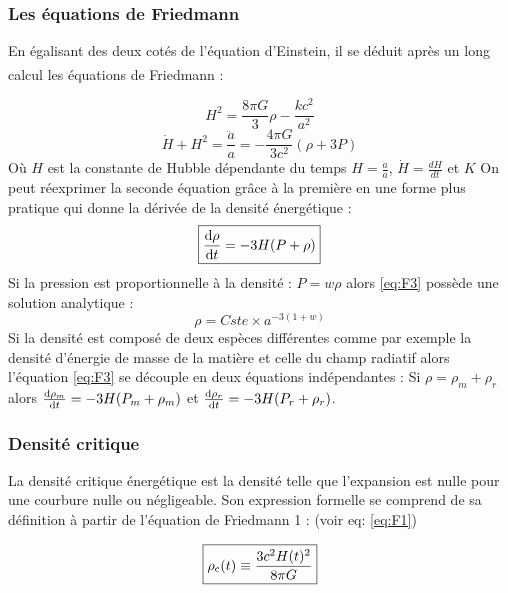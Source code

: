 \documentclass[10pt, a4paper]{report}
\numberwithin{equation}{subsection}
\begin{document}
\subsubsection{Les équations de Friedmann}
En égalisant des deux cotés de l'équation d'Einstein, il se déduit après un long calcul\textsuperscript{\cite{cours_RG1}} les équations de Friedmann :

\begin{equation} \label{eq:F1}
\boxed{H^2 = \frac{8 \pi G}{3}\rho - \frac{kc^2}{a^2}}
\end{equation}
\begin{equation} \label{eq:F2}
\boxed{\dot{H} + H^2 = \frac{\ddot{a}}{a} = - \frac{4\pi G}{3c^2}\left(\rho + 3P\right) }
\end{equation}
Où $H$ est la constante de Hubble dépendante du temps $H=\frac{\dot{a}}{a}$, $\dot{H} = \frac{dH}{dt}$ et $K$
On peut réexprimer la seconde équation grâce à la première en une forme plus pratique qui donne la dérivée de la densité énergétique :
\begin{equation} \label{eq:F3}
\boxed{\frac{{\rm d}\rho}{{\rm d}t} = - 3 H (P + \rho) }
\end{equation}
Si la pression est proportionnelle à la densité : $P= w \rho$ alors \ref{eq:F3} possède une solution analytique :
\begin{equation} \label{eq:F3S}
\boxed{\rho = Cste \times a^{-3(1+w)}}
\end{equation}
Si la densité est composé de deux espèces différentes comme par exemple la densité d'énergie de masse de la matière et celle du champ radiatif alors l'équation \ref{eq:F3} se découple en deux équations indépendantes : Si $\rho = \rho_m + \rho_r$ alors $\frac{{\rm d}\rho_m}{{\rm d}t} = - 3 H (P_m + \rho_m) $ et $\frac{{\rm d}\rho_r}{{\rm d}t} = - 3 H (P_r + \rho_r)$.



\subsubsection{Densité critique}
La densité critique énergétique est la densité telle que l'expansion est nulle pour une courbure nulle ou négligeable. Son expression formelle se comprend de sa définition à partir de l'équation de Friedmann 1 : (voir eq: \ref{eq:F1})

\begin{equation} \label{eq:DEC}
\boxed{\rho_{\rm c}(t) \equiv \frac{3 c^2 H(t)^2 }{8 \pi G} }
\end{equation}
\end{document}
